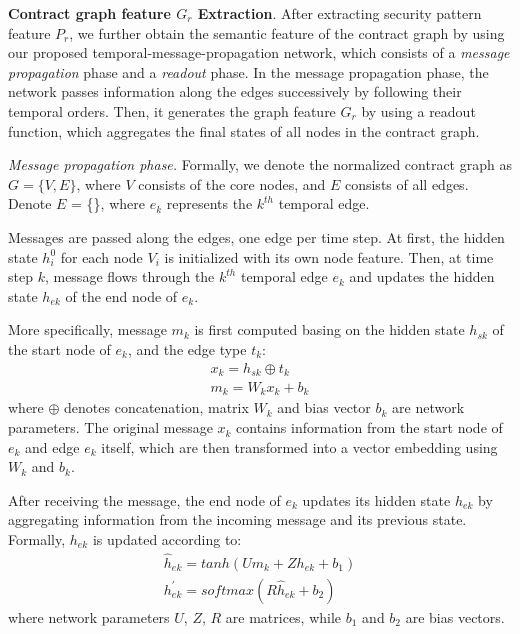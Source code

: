 \textbf{Contract graph feature $G_r$ Extraction}. 
After extracting security pattern feature $P_{r}$, we further obtain the semantic feature of the contract graph by using our proposed temporal-message-propagation network, which consists of a \emph{message propagation} phase and a \emph{readout} phase. In the message propagation phase, the network passes information along the edges successively by following their temporal orders. Then, it generates the graph feature $G_{r}$ by using a readout function, which aggregates the final states of all nodes in the contract graph.

\emph{Message propagation phase.} Formally, we denote the normalized contract graph as $G = \{V, E\}$, where $V$ consists of the core nodes, and $E$ consists of all edges. Denote $E$ = \{\}, where $e_{k}$ represents the $k^{th}$ temporal edge.

Messages are passed along the edges, one edge per time step. At first, the hidden state $h^{0}_{i}$ for each node $V_{i}$ is initialized with its own node feature. Then, at time step $k$, message flows through the $k^{th}$ temporal edge $e_{k}$ and updates the hidden state $h_{ek}$ of the end node of $e_{k}$. 

More specifically, message $m_{k}$ is first computed basing on the hidden state $h_{sk}$ of the start node of $e_{k}$, and the edge type $t_{k}$:
\begin{align}
\label{eq:e1}
x_{k} = h_{sk} \oplus t_{k} \\
m_{k} = W_{k}x_{k} + b_{k}
\end{align}
where $\oplus$ denotes concatenation, matrix $W_{k}$ and bias vector $b_k$ are network parameters. The original message $x_{k}$ contains information from the start node of $e_{k}$ and edge $e_{k}$ itself, which are then transformed into a vector embedding using $W_{k}$ and $b_k$.

After receiving the message, the end node of $e_{k}$ updates its hidden state $h_{ek}$ by aggregating information from the incoming message and its previous state. Formally, $h_{ek}$ is updated according to:
\begin{align}
\label{eq:e2}
\hat{h}_{ek} = tanh(Um_{k} + Zh_{ek} + b_{1}) \\
h^{'}_{ek} = softmax(R\hat{h}_{ek} + b_{2})
\end{align}
where network parameters $U$, $Z$, $R$ are matrices, while $b_{1}$ and $b_{2}$ are bias vectors.

